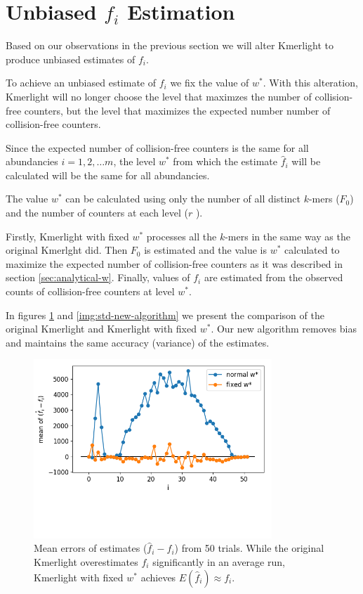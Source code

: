 \section{Unbiased $f_i$ Estimation}
\label{sec:unbiased-estimate}

Based on our observations in the previous section we will alter Kmerlight 
to produce unbiased estimates of $f_i$.

To achieve an unbiased estimate of $f_i$ we fix the value of $w^*$. 
With this alteration, Kmerlight will no longer choose the level
that maximzes the number of collision-free counters, but the level that maximizes
the expected number number of collision-free counters.

Since the expected number of collision-free counters is the same for all abundancies
$i=1,2,\dots m$, the level $w^*$ from which the estimate $\hat f_i$ will be calculated
will be the same for all abundancies.

The value $w^*$ can be calculated using only the number of all distinct
$k$-mers ($F_0$) and the number of counters at each level ($r$ ).

Firstly, Kmerlight with fixed $w^*$ processes all the $k$-mers in the same
way as the original Kmerlght did. Then $F_0$ is estimated and the
value is $w^*$ calculated to maximize the expected number of
collision-free counters as it was described in section \ref{sec:analytical-w}.
Finally, values of $f_i$ are estimated from the observed counts of 
collision-free counters at level $w^*$.

In figures \ref{img:mean-new-algorithm} and \ref{img:std-new-algorithm} we present the comparison
of the original Kmerlight and Kmerlight with fixed $w^*$. Our new algorithm removes bias
and maintains the same accuracy (variance) of the estimates.


\begin{figure}
\centerline{\includegraphics[width=0.8\textwidth, trim={0cm, 3cm, 0cm, 0cm}, clip]{images/means_comparison.png}}
\caption[Mean error of normal Kmerlight and Kmerlight with fixed $w^*$]{Mean errors of estimates
($\hat f_i - f_i$) from 50 trials. While the original Kmerlight overestimates 
$f_i$ significantly in an average run, Kmerlight with fixed $w^*$ achieves $E(\hat f_i) \approx f_i$.}
\label{img:mean-new-algorithm}
\end{figure}


